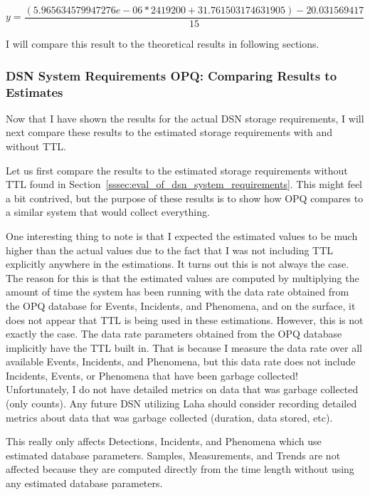 \begin{equation}
    y = \frac{(5.965634579947276e-06 * 2419200 + 31.761503174631905) - 20.031569417}{15}
    \label{eq:laha_si_ex}
\end{equation}

I will compare this result to the theoretical results in following sections.

\subsubsection{DSN System Requirements OPQ: Comparing Results to Estimates}

Now that I have shown the results for the actual DSN storage requirements, I will next compare these results to the estimated storage requirements with and without TTL\@.

Let us first compare the results to the estimated storage requirements without TTL found in Section~\ref{sssec:eval_of_dsn_system_requirements}. This might feel a bit contrived, but the purpose of these results is to show how OPQ compares to a similar system that would collect everything.

One interesting thing to note is that I expected the estimated values to be much higher than the actual values due to the fact that I was not including TTL explicitly anywhere in the estimations. It turns out this is not always the case. The reason for this is that the estimated values are computed by multiplying the amount of time the system has been running with the data rate obtained from the OPQ database for Events, Incidents, and Phenomena, and on the surface, it does not appear that TTL is being used in these estimations. However, this is not exactly the case. The data rate parameters obtained from the OPQ database implicitly have the TTL built in. That is because I measure the data rate over all available Events, Incidents, and Phenomena, but this data rate does not include Incidents, Events, or Phenomena that have been garbage collected! Unfortunately, I do not have detailed metrics on data that was garbage collected (only counts). Any future DSN utilizing Laha should consider recording detailed metrics about data that was garbage collected (duration, data stored, etc).

This really only affects Detections, Incidents, and Phenomena which use estimated database parameters. Samples, Measurements, and Trends are not affected because they are computed directly from the time length without using any estimated database parameters.

